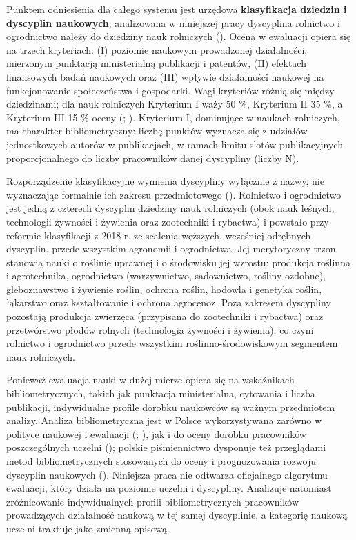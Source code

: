 \documentclass[
  polish,
  12pt,
  a4paper,
]{article}
\begin{document}
Punktem odniesienia dla całego systemu jest urzędowa
\textbf{klasyfikacja dziedzin i dyscyplin naukowych}; analizowana w
niniejszej pracy dyscyplina rolnictwo i ogrodnictwo należy do dziedziny
nauk rolniczych (). Ocena w ewaluacji opiera się na trzech
kryteriach: (I) poziomie naukowym prowadzonej działalności, mierzonym
punktacją ministerialną publikacji i patentów, (II) efektach finansowych
badań naukowych oraz (III) wpływie działalności naukowej na
funkcjonowanie społeczeństwa i gospodarki. Wagi kryteriów różnią się
między dziedzinami; dla nauk rolniczych Kryterium I waży 50 \%,
Kryterium II 35 \%, a Kryterium III 15 \% oceny
(;
). Kryterium I, dominujące w naukach rolniczych, ma
charakter bibliometryczny: liczbę punktów wyznacza się z udziałów
jednostkowych autorów w publikacjach, w ramach limitu slotów
publikacyjnych proporcjonalnego do liczby pracowników danej dyscypliny
(liczby N).

Rozporządzenie klasyfikacyjne wymienia dyscypliny wyłącznie z nazwy, nie
wyznaczając formalnie ich zakresu przedmiotowego
(). Rolnictwo i ogrodnictwo jest jedną z czterech
dyscyplin dziedziny nauk rolniczych (obok nauk leśnych, technologii
żywności i żywienia oraz zootechniki i rybactwa) i powstało przy
reformie klasyfikacji z 2018 r. ze scalenia węższych, wcześniej
odrębnych dyscyplin, przede wszystkim agronomii i ogrodnictwa. Jej
merytoryczny trzon stanowią nauki o roślinie uprawnej i o środowisku jej
wzrostu: produkcja roślinna i agrotechnika, ogrodnictwo (warzywnictwo,
sadownictwo, rośliny ozdobne), gleboznawstwo i żywienie roślin, ochrona
roślin, hodowla i genetyka roślin, łąkarstwo oraz kształtowanie i
ochrona agrocenoz. Poza zakresem dyscypliny pozostają produkcja
zwierzęca (przypisana do zootechniki i rybactwa) oraz przetwórstwo
płodów rolnych (technologia żywności i żywienia), co czyni rolnictwo i
ogrodnictwo przede wszystkim roślinno-środowiskowym segmentem nauk
rolniczych.

Ponieważ ewaluacja nauki w dużej mierze opiera się na wskaźnikach
bibliometrycznych, takich jak punktacja ministerialna, cytowania i
liczba publikacji, indywidualne profile dorobku naukowców są ważnym
przedmiotem analizy. Analiza bibliometryczna jest w Polsce
wykorzystywana zarówno w polityce naukowej i ewaluacji
(;
), jak i do oceny dorobku
pracowników poszczególnych uczelni (); polskie piśmiennictwo dysponuje też
przeglądami metod bibliometrycznych stosowanych do oceny i prognozowania
rozwoju dyscyplin naukowych (). Niniejsza praca nie odtwarza oficjalnego algorytmu ewaluacji,
który działa na poziomie uczelni i dyscypliny. Analizuje natomiast
zróżnicowanie indywidualnych profili bibliometrycznych pracowników
prowadzących działalność naukową w tej samej dyscyplinie, a kategorię
naukową uczelni traktuje jako zmienną opisową.
\end{document}
